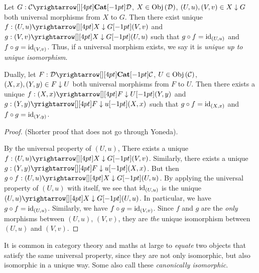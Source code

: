 \begin{prop}\hypertarget{uniprop}{}
  
  Let $G : \map{\CC}{\DD}{\CAT}{}$, $X \in \mathrm{Obj}\left(\mathcal{D}\right)$, 
  $(U,u), (V,v) \in X\downarrow G$ both universal morphisms from $X$ to $G$. 
  Then there exist unique $f : \map{(U,u)}{(V,v)}{X\darrow G}{}$
  and $g : \map{(V,v)}{(U,u)}{X\darrow G}{}$ such that 
  $g \circ f = \mathrm{id}_{(U,u)}$ and $f \circ g = \mathrm{id}_{(V,v)}$.
  Thus, if a universal morphism exists, 
  we say it is \emph{unique up to unique isomorphism}.

  Dually, let $F : \map{\DD}{\CC}{\CAT}{}$, $U \in \mathrm{Obj}\left(\mathcal{C}\right)$,
  $(X,x), (Y,y) \in F\downarrow U$ both universal morphisms from $F$ to $U$.
  Then there exists a unique $f : \map{(X,x)}{(Y,y)}{F\darrow U}{}$
  and $g : \map{(Y,y)}{(X,x)}{F\darrow u}{}$ such that 
  $g \circ f = \mathrm{id}_{(X,x)}$ and $f \circ g = \mathrm{id}_{(Y,y)}$.
\end{prop}
\begin{proof}(Shorter proof that does not go through Yoneda).

  By the universal property of $(U,u)$,
  There exists a unique $f : \map{(U,u)}{(V,v)}{X\darrow G}{}$.
  Similarly, there exists a unique $g : \map{(Y,y)}{(X,x)}{F\darrow u}{}$.
  But then $g \circ f : \map{(U,u)}{(U,u)}{X\darrow G}{}$.
  By applying the universal property of $(U,u)$ with itself,
  we see that $\mathrm{id}_{(U,u)}$ is the unique $\map{(U,u)}{(U,u)}{X\darrow G}{}$.
  In particular, we have $g \circ f = \mathrm{id}_{(U,u)}$.
  Similarly, we have $f \circ g = \mathrm{id}_{(V,v)}$.
  Since $f$ and $g$ are the \emph{only} morphisms between $(U,u)$, $(V,v)$,
  they are \emph{the} unique isomorphism between $(U,u)$ and $(V,v)$.
\end{proof}

\begin{rmk}

  It is common in category theory and maths at large to \emph{equate} 
  two objects that satisfy the same universal property, 
  since they are not only isomorphic, but also isomorphic in a unique way. 
  Some also call these \emph{canonically isomorphic}.
\end{rmk}

